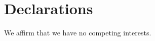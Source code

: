 \documentclass[pdflatex,sn-mathphys-num]{sn-jnl}%
\theoremstyle{thmstyleone}%
\theoremstyle{thmstyletwo}%
\theoremstyle{thmstylethree}%
\begin{document}
\section*{Declarations}
We affirm that we have no competing interests.












\end{document}
